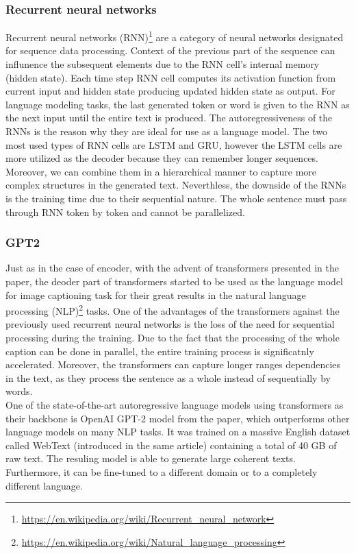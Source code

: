 \subsubsection{Recurrent neural networks}
Recurrent neural networks (RNN)\footnote[2]{\url{https://en.wikipedia.org/wiki/Recurrent\_neural\_network}} are a category of neural networks designated for sequence data processing. Context of the previous part of the sequence can influnence the subsequent elements due to the RNN cell's internal memory (hidden state). Each time step RNN cell computes its activation function from current input and hidden state producing updated hidden state as output. For language modeling tasks, the last generated token or word is given to the RNN as the next input until the entire text is produced. The autoregressiveness of the RNNs is the reason why they are ideal for use as a language model. The two most used types of RNN cells are LSTM\citep{hochreiter1997long} and GRU\citep{cho2014learning}, however the LSTM cells are more utilized as the decoder because they can remember longer sequences. Moreover, we can combine them in a hierarchical manner to capture more complex structures in the generated text. Neverthless, the downside of the RNNs is the training time due to their sequential nature. The whole sentence must pass through RNN token by token and cannot be parallelized.

\subsubsection{GPT2}
Just as in the case of encoder, with the advent of transformers presented in the \citet{vaswani2017attention} paper, the deoder part of transformers started to be used as the language model for image captioning task for their great results in the natural language processing (NLP)\footnote[3]{\url{https://en.wikipedia.org/wiki/Natural\_language\_processing}} tasks. One of the advantages of the transformers against the previously used recurrent neural networks is the loss of the need for sequential processing during the training. Due to the fact that the processing of the whole caption can be done in parallel, the entire training process is significatnly accelerated. Moreover, the transformers can capture longer ranges dependencies in the text, as they process the sentence as a whole instead of sequentially by words.\\

One of the state-of-the-art autoregressive language models using transformers as their backbone is OpenAI GPT-2 model from the \citet{radford2019language} paper, which outperforms other language models on many NLP tasks. It was trained on a massive English dataset called WebText (introduced in the same article) containing a total of 40 GB of raw text. The resuling model is able to generate large coherent texts. Furthermore, it can be fine-tuned to a different domain or to a completely different language.

